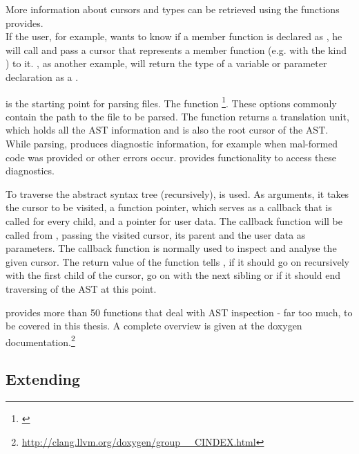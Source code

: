 More information about cursors and types can be retrieved using the functions  provides.
\\If the user, for example, wants to know if a member function is declared as , he will call  and pass a cursor that represents a member function (e.g. with the kind ) to it. , as another example, will return the type of a variable or parameter declaration as a .

 is the starting point for parsing  files. The function \footnote{\citep{ClangAPIDoc}}. These options commonly contain the path to the file to be parsed. The function returns a translation unit, which holds all the AST information and is also the root cursor of the AST. While parsing,  produces diagnostic information, for example when mal-formed  code was provided or other errors occur.  provides functionality to access these diagnostics.

To traverse the abstract syntax tree (recursively),  is used. As arguments, it takes the cursor to be visited, a function pointer, which serves as a callback that is called for every child, and a  pointer for user data. The callback function will be called from , passing the visited cursor, its parent and the user data as parameters. The callback function is normally used to inspect and analyse the given cursor. The return value of the function tells , if it should go on recursively with the first child of the cursor, go on with the next sibling or if it should end traversing of the AST at this point.

 provides more than 50 functions that deal with AST inspection - far too much, to be covered in this thesis. A complete overview is given at the  doxygen documentation.\footnote{\url{http://clang.llvm.org/doxygen/group\_\_CINDEX.html}}

\subsection{Extending }

